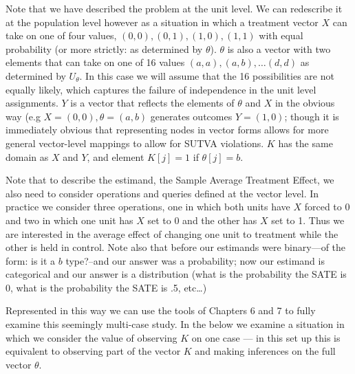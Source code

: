 \documentclass[
  12pt,
]{book}
\begin{document}
Note that we have described the problem at the unit level. We can redescribe it at the population level however as a situation in which a treatment vector \(X\) can take on one of four values, \((0,0), (0,1), (1,0), (1,1)\) with equal probability (or more strictly: as determined by \(\theta\)). \(\theta\) is also a vector with two elements that can take on one of 16 values \((a,a), (a,b),\dots (d,d)\) as determined by \(U_\theta\). In this case we will assume that the 16 possibilities are not equally likely, which captures the failure of independence in the unit level assignments. \(Y\) is a vector that reflects the elements of \(\theta\) and \(X\) in the obvious way (e.g \(X=(0,0), \theta=(a,b)\) generates outcomes \(Y=(1,0)\); though it is immediately obvious that representing nodes in vector forms allows for more general vector-level mappings to allow for SUTVA violations. \(K\) has the same domain as \(X\) and \(Y\), and element \(K[j]=1\) if \(\theta[j]=b\).

Note that to describe the estimand, the Sample Average Treatment Effect, we also need to consider operations and queries defined at the vector level. In practice we consider three operations, one in which both units have \(X\) forced to 0 and two in which one unit has \(X\) set to 0 and the other has \(X\) set to 1. Thus we are interested in the average effect of changing one unit to treatment while the other is held in control. Note also that before our estimands were binary---of the form: is it a \(b\) type?--and our answer was a probability; now our estimand is categorical and our answer is a distribution (what is the probability the SATE is 0, what is the probability the SATE is .5, etc\ldots)

Represented in this way we can use the tools of Chapters 6 and 7 to fully examine this seemingly multi-case study. In the below we examine a situation in which we consider the value of observing \(K\) on one case --- in this set up this is equivalent to observing part of the vector \(K\) and making inferences on the full vector \(\theta\).
\end{document}
